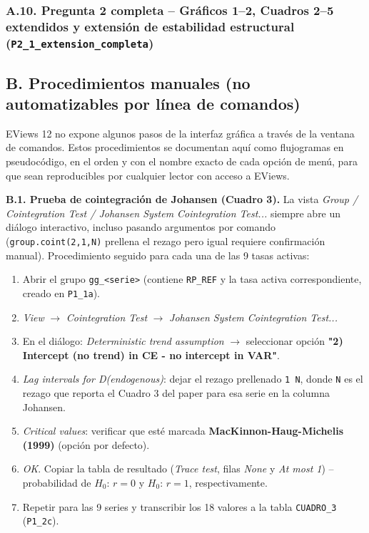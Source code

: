 \documentclass[12pt, letterpaper]{article}
\begin{document}
\subsubsection*{A.10. Pregunta 2 completa -- Gráficos 1--2, Cuadros
                    2--5 extendidos y extensión de estabilidad
                    estructural (\texttt{P2\_1\_extension\_completa})}


\subsection*{B. Procedimientos manuales (no automatizables por
              línea de comandos)}

EViews 12 no expone algunos pasos de la interfaz gráfica a través de la
ventana de comandos. Estos procedimientos se documentan aquí como
flujogramas en pseudocódigo, en el orden y con el nombre exacto de cada
opción de menú, para que sean reproducibles por cualquier lector con
acceso a EViews.

\textbf{B.1. Prueba de cointegración de Johansen (Cuadro 3).}
La vista \textit{Group / Cointegration Test / Johansen System
Cointegration Test...} siempre abre un diálogo interactivo, incluso
pasando argumentos por comando (\lstinline{group.coint(2,1,N)} prellena
el rezago pero igual requiere confirmación manual). Procedimiento
seguido para cada una de las 9 tasas activas:
\begin{enumerate}
  \item Abrir el grupo \texttt{gg\_<serie>} (contiene \texttt{RP\_REF}
        y la tasa activa correspondiente, creado en \texttt{P1\_1a}).
  \item \textit{View} $\to$ \textit{Cointegration Test} $\to$
        \textit{Johansen System Cointegration Test...}
  \item En el diálogo: \textit{Deterministic trend assumption} $\to$
        seleccionar opción \textbf{"2) Intercept (no trend) in CE - no
        intercept in VAR"}.
  \item \textit{Lag intervals for D(endogenous)}: dejar el rezago
        prellenado \texttt{1 N}, donde \texttt{N} es el rezago que
        reporta el Cuadro 3 del paper para esa serie en la columna
        Johansen.
  \item \textit{Critical values}: verificar que esté marcada
        \textbf{MacKinnon-Haug-Michelis (1999)} (opción por defecto).
  \item \textit{OK}. Copiar la tabla de resultado (\textit{Trace test},
        filas \textit{None} y \textit{At most 1}) -- probabilidad de
        $H_0{:}\,r=0$ y $H_0{:}\,r=1$, respectivamente.
  \item Repetir para las 9 series y transcribir los 18 valores a la
        tabla \texttt{CUADRO\_3} (\texttt{P1\_2c}).
\end{enumerate}
\end{document}

